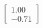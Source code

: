 \documentclass[preview]{standalone}
\begin{document}
\begin{align*}
\begin{bmatrix} 1.00 \\ -0.71 \end{bmatrix}
\end{align*}
\end{document}
